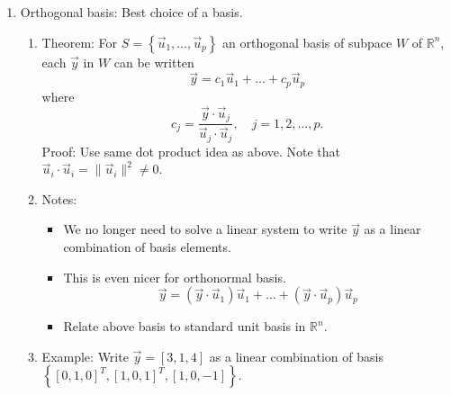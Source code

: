 \documentclass{article}
\begin{document}
\begin{enumerate}
\item Orthogonal basis: Best choice of a basis.
\begin{enumerate}
\item Theorem: For $S = \left\{ \vec{u}_1 , \dots, \vec{u}_p \right\}$ an orthogonal basis of subpace $W$ of $\mathbb{R}^n$, each $\vec{y}$ in $W$ can be written
\[
\vec{y} = c_1 \vec{u}_1 + \dots + c_p \vec{u}_p
\]
where
\[
c_j = \frac{\vec{y} \cdot \vec{u}_j}{\vec{u}_j \cdot \vec{u}_j}, \quad j = 1,2,\dots,p.
\]
Proof: Use same dot product idea as above. Note that $\vec{u}_i \cdot \vec{u}_i = \|\vec{u}_i \|^2 \neq 0$.
\item Notes: 
\begin{itemize}
\item We no longer need to solve a linear system to write $\vec{y}$ as a linear combination of basis elements.
\item This is even nicer for orthonormal basis.
\[
\vec{y} = (\vec{y} \cdot \vec{u}_1) \vec{u}_1 + \dots + (\vec{y} \cdot \vec{u}_p) \vec{u}_p
\]
\item Relate above basis to standard unit basis in $\mathbb{R}^n$. 
\end{itemize}
\item Example: Write $\vec{y} = [3,1,4]$ as a linear combination of basis $\left\{ [0,1,0]^T, [1,0,1]^T, [1,0,-1] \right\}$.
\end{enumerate}


\end{enumerate}
\end{document}

